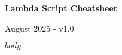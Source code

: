\documentclass[10pt,a4paper]{article}
\begin{document}
\begin{center}
{\Large \textbf{Lambda Script Cheatsheet}}
\end{center}
\vspace{-8pt}
\begin{flushright}
{\small August 2025 - v1.0}
\end{flushright}

\vspace{3pt}

\begin{multicols*}{3}
\raggedright
$body$
\end{multicols*}
\end{document}
